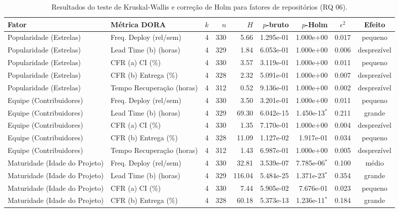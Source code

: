 \begin{table}[ht]
\centering
\caption{Resultados do teste de Kruskal-Wallis e correção de Holm para fatores de repositórios (RQ 06).}
\label{tab:rq06_kruskal}
\small
\begin{tabular}{llrrrrrcc}
\toprule
\textbf{Fator} & \textbf{Métrica DORA} & \textbf{$k$} & \textbf{$n$} & \textbf{$H$} & \textbf{$p$-bruto} & \textbf{$p$-Holm} & \textbf{$\epsilon^2$} & \textbf{Efeito} \\
\midrule
Popularidade (Estrelas) & Freq. Deploy (rel/sem) & 4 & 330 & 5.66 & 1.295e-01 & 1.000e+00 & 0.017 & pequeno \\
Popularidade (Estrelas) & Lead Time (b) (horas) & 4 & 329 & 1.84 & 6.053e-01 & 1.000e+00 & 0.006 & desprezível \\
Popularidade (Estrelas) & CFR (a) CI (\%) & 4 & 330 & 3.57 & 3.119e-01 & 1.000e+00 & 0.011 & pequeno \\
Popularidade (Estrelas) & CFR (b) Entrega (\%) & 4 & 328 & 2.32 & 5.091e-01 & 1.000e+00 & 0.007 & desprezível \\
Popularidade (Estrelas) & Tempo Recuperação (horas) & 4 & 312 & 0.52 & 9.136e-01 & 1.000e+00 & 0.002 & desprezível \\
Equipe (Contribuidores) & Freq. Deploy (rel/sem) & 4 & 330 & 3.50 & 3.201e-01 & 1.000e+00 & 0.011 & pequeno \\
Equipe (Contribuidores) & Lead Time (b) (horas) & 4 & 329 & 69.30 & 6.042e-15 & 1.450e-13$^*$ & 0.211 & grande \\
Equipe (Contribuidores) & CFR (a) CI (\%) & 4 & 330 & 1.35 & 7.170e-01 & 1.000e+00 & 0.004 & desprezível \\
Equipe (Contribuidores) & CFR (b) Entrega (\%) & 4 & 328 & 11.09 & 1.127e-02 & 1.917e-01 & 0.034 & pequeno \\
Equipe (Contribuidores) & Tempo Recuperação (horas) & 4 & 312 & 1.43 & 6.987e-01 & 1.000e+00 & 0.005 & desprezível \\
Maturidade (Idade do Projeto) & Freq. Deploy (rel/sem) & 4 & 330 & 32.81 & 3.539e-07 & 7.785e-06$^*$ & 0.100 & médio \\
Maturidade (Idade do Projeto) & Lead Time (b) (horas) & 4 & 329 & 116.04 & 5.484e-25 & 1.371e-23$^*$ & 0.354 & grande \\
Maturidade (Idade do Projeto) & CFR (a) CI (\%) & 4 & 330 & 7.44 & 5.905e-02 & 7.676e-01 & 0.023 & pequeno \\
Maturidade (Idade do Projeto) & CFR (b) Entrega (\%) & 4 & 328 & 60.18 & 5.373e-13 & 1.236e-11$^*$ & 0.184 & grande \\

\end{tabular}
\end{table}
